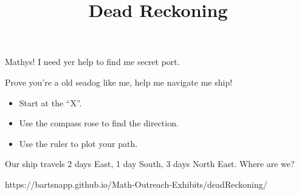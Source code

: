 \documentclass{../exhibit}
\title{Dead Reckoning}
\begin{document}
\begin{context}
  Mathys! I need yer help to find me secret port. 


  \vspace{1cm}

  
  Prove you're a old seadog like me, help me navigate me ship!


\end{context}



\begin{directions}
  \begin{itemize}
  \item Start at the ``X''.
  \item Use the compass rose to find the direction.
  \item Use the ruler to plot your path.
  \end{itemize}
  
\end{directions}



\begin{example}%
  Our ship travels 2 days East, 1 day South, 3 days North East. Where are we?
\begin{center}
\end{center}
\end{example}



\begin{mathConnections}
    https://bartsnapp.github.io/Math-Outreach-Exhibits/deadReckoning/
\end{mathConnections}
\end{document}
